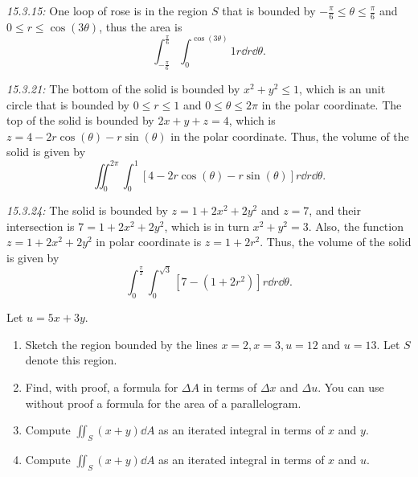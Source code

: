 \documentclass[8pt,twocolumn]{article}
\begin{document}
\begin{Answer}[number=13]
  \emph{15.3.15:} One loop of rose is in the region $S$ that is bounded by
  $-\frac{\pi}{6}\le\theta\le\frac{\pi}{6}$ and $0\le r\le\cos(3\theta)$, thus
  the area is
  \[\int_{-\frac{\pi}{6}}^{\frac{\pi}{6}}\int_0^{\cos(3\theta)}1 r\dd{r}\dd{\theta}.\]

  \emph{15.3.21:} The bottom of the solid is bounded by $x^2+y^2\le1$, which is
  an unit circle that is bounded by $0\le r\le 1$ and $0\le\theta\le2\pi$ in
  the polar coordinate. The top of the solid is bounded by $2x+y+z=4$, which is
  $z=4-2r\cos(\theta)-r\sin(\theta)$ in the polar coordinate. Thus, the volume
  of the solid is given by
  \[
    \iint_0^{2\pi}\int_0^1 [4-2r\cos(\theta)-r\sin(\theta)] r \dd{r}
    \dd{\theta}.
  \]

  \emph{15.3.24:} The solid is bounded by $z=1+2x^2+2y^2$ and $z=7$, and their
  intersection is $7=1+2x^2+2y^2$, which is in turn $x^2+y^2=3$. Also, the
  function $z=1+2x^2+2y^2$ in polar coordinate is $z=1+2r^2$. Thus, the volume
  of the solid is given by
  \[
    \int_0^{\frac{\pi}{2}}\int_0^{\sqrt{3}}[7-(1+2r^2)]r\dd{r}\dd{\theta}.
  \]
\end{Answer}

\begin{Exercise}[number=14]
  Let $u = 5x + 3y$.
  \begin{enumerate}
    \item Sketch the region bounded by the lines $x=2, x=3, u=12$ and $u=13$.
      Let $S$ denote this region.
    \item Find, with proof, a formula for $\Delta A$ in terms of $\Delta x$ and
      $\Delta u$. You can use without proof a formula for the area of a
      parallelogram.
    \item Compute $\iint_S (x+y) \dd{A}$ as an iterated integral in terms of
      $x$ and $y$.
    \item Compute $\iint_S (x+y) \dd{A}$ as an iterated integral in terms of
      $x$ and $u$.
  \end{enumerate}
\end{Exercise}
\end{document}

